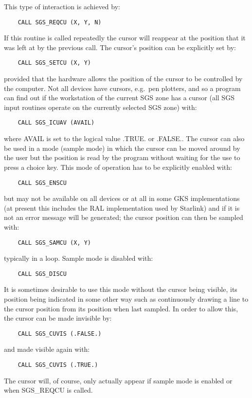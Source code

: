 This type of interaction is achieved by:
\begin{verbatim}
    CALL SGS_REQCU (X, Y, N)
\end{verbatim}
If
this routine is called repeatedly the cursor will reappear at the position
that it was left at by the previous call.  The
cursor's position can be explicitly
set by:
\begin{verbatim}
    CALL SGS_SETCU (X, Y)
\end{verbatim}
provided that the hardware allows the position of the cursor to be controlled
by the computer.  Not all devices have cursors, e.g.\ pen plotters, and so a 
program can find out if the workstation
of the current SGS zone has a cursor (all SGS 
input routines operate on the currently selected SGS
zone) with:
\begin{verbatim}
    CALL SGS_ICUAV (AVAIL)
\end{verbatim}
where AVAIL is set to the logical value .TRUE.
or .FALSE..  The cursor can also 
be used in a mode (sample mode) in which the cursor can be moved around by the 
user but the position is read by the program without waiting for the use to
press a choice key.  This mode of operation has to be explicitly enabled with:
\begin{verbatim}
    CALL SGS_ENSCU
\end{verbatim}
but may not be available on all devices or at all in some GKS 
implementations (at present this
includes the RAL implementation used by Starlink) and if it is not 
an error message will be generated;  the cursor position can 
then be sampled with:
\begin{verbatim}
    CALL SGS_SAMCU (X, Y)
\end{verbatim}
typically in a loop.  Sample mode is disabled with:
\begin{verbatim}
    CALL SGS_DISCU
\end{verbatim}
It is sometimes desirable to use this mode without the cursor being visible,
its position being indicated in some other way such as continuously drawing a 
line to the cursor position from its position when last
sampled.  In order to 
allow this, the cursor can be made invisible by:
\begin{verbatim}
    CALL SGS_CUVIS (.FALSE.)
\end{verbatim}
and made visible again with:
\begin{verbatim}
    CALL SGS_CUVIS (.TRUE.)
\end{verbatim}
The cursor will, of course,
only actually appear if sample mode is enabled or
when SGS\_REQCU is called.

